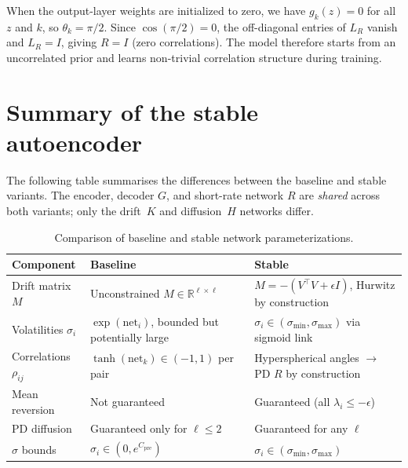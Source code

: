 \begin{remark}[Initialization]
When the output-layer weights are initialized to zero, we have $g_k(z) = 0$ for all $z$ and $k$, so $\theta_k = \pi/2$.
Since $\cos(\pi/2) = 0$, the off-diagonal entries of $L_R$ vanish and $L_R = I$, giving $R = I$ (zero correlations).
The model therefore starts from an uncorrelated prior and learns non-trivial correlation structure during training.
\end{remark}


\section{Summary of the stable autoencoder}
\label{sec:stable_summary}

The following table summarises the differences between the baseline and stable variants.
The encoder, decoder $G$, and short-rate network $R$ are \emph{shared} across both variants; only the drift~$K$ and diffusion~$H$ networks differ.

\begin{table}[H]
\centering
\caption{Comparison of baseline and stable network parameterizations.}
\label{tab:stable_summary}
\begin{tabular}{@{}lll@{}}
\toprule
\textbf{Component} & \textbf{Baseline} & \textbf{Stable} \\
\midrule
Drift matrix $M$ & Unconstrained $M \in \mathbb{R}^{\ell \times \ell}$ & $M = -(V^\top V + \epsilon I)$, Hurwitz by construction \\
Volatilities $\sigma_i$ & $\exp(\text{net}_i)$, bounded but potentially large & $\sigma_i \in (\sigma_{\min}, \sigma_{\max})$ via sigmoid link \\
Correlations $\rho_{ij}$ & $\tanh(\text{net}_k) \in (-1,1)$ per pair & Hyperspherical angles $\to$ PD $R$ by construction \\
\midrule
Mean reversion & Not guaranteed & Guaranteed (all $\lambda_i \leq -\epsilon$) \\
PD diffusion & Guaranteed only for $\ell \leq 2$ & Guaranteed for any $\ell$ \\
$\sigma$ bounds & $\sigma_i \in (0, e^{C_{\text{pre}}})$ & $\sigma_i \in (\sigma_{\min}, \sigma_{\max})$ \\
\bottomrule
\end{tabular}
\end{table}

